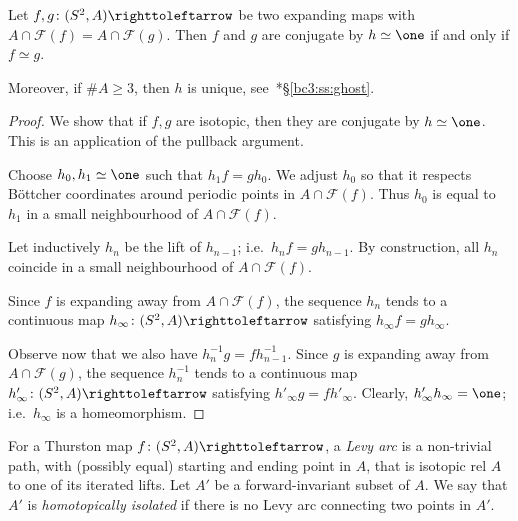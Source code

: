 \documentclass{amsart}
\newcommand\Fatou{{\mathcal F}}
\begin{document}
\begin{lem}\label{lem:ConjBetwExpMaps}
  Let $f,g\colon (S^2,A)\selfmap$ be two expanding maps with
  $A\cap\Fatou(f)=A\cap\Fatou(g)$. Then $f$ and $g$ are conjugate by
  $h\simeq \one$ if and only if $f\simeq g$.
\end{lem}
Moreover, if $\#A\ge 3$, then $h$ is unique,
see~\cite{bartholdi-dudko:bc3}*{\S\ref{bc3:ss:ghost}}.%
\begin{proof}
  We show that if $f, g$ are isotopic, then they are conjugate by
  $h\simeq \one$. This is an application of the pullback argument.

  Choose $h_0,h_1\simeq \one$ such that $h_1f = g h_0$. We adjust $h_0$
  so that it respects B\"ottcher coordinates around periodic points in
  $A\cap\Fatou(f)$. Thus $h_0$ is equal to $h_1$ in a small
  neighbourhood of $A\cap\Fatou(f)$.

  Let inductively $h_n$ be the lift of $h_{n-1}$; i.e.\
  $h_n f = g h_{n-1}$. By construction, all $h_n$ coincide in a small
  neighbourhood of $A\cap\Fatou(f)$.

  Since $f$ is expanding away from $A\cap\Fatou(f)$, the
  sequence $h_n$ tends to a continuous map
  $h_\infty\colon (S^2,A)\selfmap$ satisfying
  $h_\infty f = g h_\infty$.

  Observe now that we also have $h^{-1}_n g = f h^{-1}_{n-1}$. Since
  $g$ is expanding away from $A\cap\Fatou(g)$, the sequence $h_n^{-1}$
  tends to a continuous map $h'_\infty\colon (S^2,A)\selfmap$
  satisfying $h'_\infty g = f h'_\infty$. Clearly,
  $h'_\infty h_\infty=\one$; i.e.\ $h_\infty$ is a homeomorphism.
\end{proof}

For a Thurston map $f\colon (S^2,A)\selfmap$, a \emph{Levy arc} is a
non-trivial path, with (possibly equal) starting and ending point in
$A$, that is isotopic rel $A$ to one of its iterated lifts.  Let $A'$
be a forward-invariant subset of $A$. We say that $A'$ is
\emph{homotopically isolated} if there is no Levy arc connecting two
points in $A'$.
\end{document}
